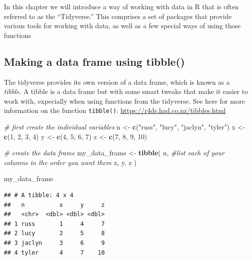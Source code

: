 \documentclass[
  12pt,
]{book}
\newenvironment{Shaded}{\begin{snugshade}}{\end{snugshade}}
\newcommand{\CommentTok}[1]{\textcolor[rgb]{0.56,0.35,0.01}{\textit{#1}}}
\newcommand{\DecValTok}[1]{\textcolor[rgb]{0.00,0.00,0.81}{#1}}
\newcommand{\FunctionTok}[1]{\textcolor[rgb]{0.13,0.29,0.53}{\textbf{#1}}}
\newcommand{\NormalTok}[1]{#1}
\newcommand{\OtherTok}[1]{\textcolor[rgb]{0.56,0.35,0.01}{#1}}
\newcommand{\StringTok}[1]{\textcolor[rgb]{0.31,0.60,0.02}{#1}}
\begin{document}
In this chapter we will introduce a way of working with data in R that is often referred to as the ``Tidyverse.'' This comprises a set of packages that provide various tools for working with data, as well as a few special ways of using those functions

\hypertarget{making-a-data-frame-using-tibble}{%
\subsection{Making a data frame using tibble()}\label{making-a-data-frame-using-tibble}}

The tidyverse provides its own version of a data frame, which is known as a \emph{tibble}. A tibble is a data frame but with some smart tweaks that make it easier to work with, expecially when using functions from the tidyverse. See here for more information on the function \texttt{tibble()}: \url{https://r4ds.had.co.nz/tibbles.html}

\begin{Shaded}
\begin{Highlighting}[]
\CommentTok{\# first create the individual variables}
\NormalTok{n }\OtherTok{\textless{}{-}} \FunctionTok{c}\NormalTok{(}\StringTok{"russ"}\NormalTok{, }\StringTok{"lucy"}\NormalTok{, }\StringTok{"jaclyn"}\NormalTok{, }\StringTok{"tyler"}\NormalTok{)}
\NormalTok{x }\OtherTok{\textless{}{-}} \FunctionTok{c}\NormalTok{(}\DecValTok{1}\NormalTok{, }\DecValTok{2}\NormalTok{, }\DecValTok{3}\NormalTok{, }\DecValTok{4}\NormalTok{)}
\NormalTok{y }\OtherTok{\textless{}{-}} \FunctionTok{c}\NormalTok{(}\DecValTok{4}\NormalTok{, }\DecValTok{5}\NormalTok{, }\DecValTok{6}\NormalTok{, }\DecValTok{7}\NormalTok{)}
\NormalTok{z }\OtherTok{\textless{}{-}} \FunctionTok{c}\NormalTok{(}\DecValTok{7}\NormalTok{, }\DecValTok{8}\NormalTok{, }\DecValTok{9}\NormalTok{, }\DecValTok{10}\NormalTok{)}

\CommentTok{\# create the data frame}
\NormalTok{my\_data\_frame }\OtherTok{\textless{}{-}}
  \FunctionTok{tibble}\NormalTok{(}
\NormalTok{    n, }\CommentTok{\#list each of your columns in the order you want them}
\NormalTok{    x,}
\NormalTok{    y,}
\NormalTok{    z}
\NormalTok{  )}

\NormalTok{my\_data\_frame}
\end{Highlighting}
\end{Shaded}

\begin{verbatim}
## # A tibble: 4 x 4
##   n          x     y     z
##   <chr>  <dbl> <dbl> <dbl>
## 1 russ       1     4     7
## 2 lucy       2     5     8
## 3 jaclyn     3     6     9
## 4 tyler      4     7    10
\end{verbatim}
\end{document}
